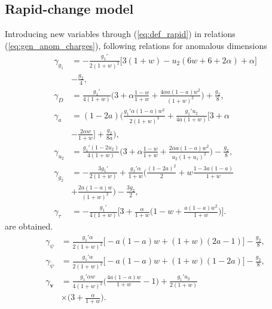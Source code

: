 \documentclass[aps,pre,url,twocolumn,superscriptaddress]{revtex4-1}
\def\mv{{\bm v}}
\begin{document}
\subsection{Rapid-change model\label{app:rapid}}	
Introducing new variables through (\ref{eq:def_rapid}) in relations (\ref{eq:gen_anom_charges}), 
following relations for anomalous dimensions 
\begin{align}
  \gamma_{g_1} & = 
  -\frac{g_1'}{2(1+w)^2}\biggl[
  3(1+w) - u_2(6w + 6 + 2\alpha)+ \alpha\biggl]
  \nonumber \\ 
  &- \frac{g_2}{4}
  ,\nonumber\\
  \gamma_D & = \frac{g_1'}{4(1+w)} \biggl( 3+\alpha\frac{1-w}{1+w} + 
      \frac{4\alpha a(1-a)w^2}{(1+w)^2}   \biggl) +\frac{g_2}{8},\nonumber \\
  \gamma_a & = (1-2a)\biggl(\frac{g_1'\alpha(1-a)w^2}{2(1+w)^3}  + 
      \frac{g_1' u_2}{4a(1+w)}\biggl[  3+\alpha\nonumber\\
      & - \frac{2\alpha w}{1+w}
      \biggl] + \frac{g_2}{8a}   \biggl), 
      \nonumber
      \\
  \gamma_{u_2} & = \frac{g_1'(1-2u_2)}{4(1+w)}\biggl(3+\alpha\frac{1-w}{1+w} +
      \frac{2\alpha a (1-a)w^2}{u_2(1+u_1)^2} \biggl)
      -\frac{g_2}{8} , \nonumber  \\
  \gamma_{g_2} & = -\frac{3g_1' }{2(1+w)} + \frac{g_1' \alpha}{1+w}\biggl( \frac{(1-2a)^2}{2} +
      w\frac{1-3a(1-a)}{1+w}  \nonumber \\
      & +  \frac{2a(1-a)w}{(1+w)^2}  \biggl)
    - \frac{3g_2}{2},  \nonumber\\
   \gamma_{\tau} & =  -\frac{g_1'}{4(1+w)}\biggl[
   3+\frac{\alpha}{1+w} \biggl(
   1-w + \frac{a(1-a)w^2}{1+w}
   \biggl)
   \biggl].
     \label{eq:rapid_anom_charges}  
\end{align}
are obtained.
\begin{align}
  \gamma_{\psi} & = \frac{g_1' \alpha}{2(1+w)^2}\biggl[
  -a(1-a)w + (1+w)(2a-1)
  \biggl] - \frac{g_2}{8},\nonumber \\
  \gamma_{\tilde{\psi}} & = \frac{g_1' \alpha}{2(1+w)^2}\biggl[
  -a(1-a)w + (1+w)(1-2a)
  \biggl] - \frac{g_2}{8}, \nonumber \\
  \gamma_{\mv} & =  \frac{g_1' \alpha w}{4(1+w)^2}\biggl(\frac{4a(1-a)w}{1+w} - 1 \biggl) + 
      \frac{g_1' u_2}{2(1+w)} \nonumber \\
      & \times  \biggl(3+ \frac{\alpha }{1+w} \biggl). %
  \label{eq:rapid_anom_fields}
\end{align}
\end{document}
